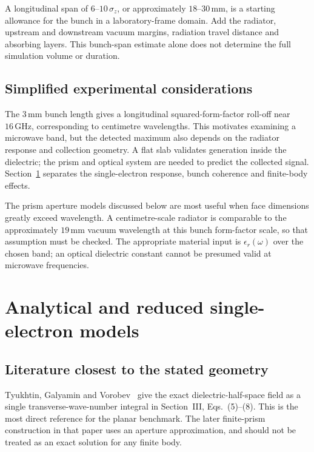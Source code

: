 \documentclass[11pt,a4paper]{article}
\newcommand{\unit}[1]{\,\mathrm{#1}}
\numberwithin{equation}{section}
\begin{document}
A longitudinal span of \(6\)--\(10\,\sigma_z\), or approximately
\(18\)--\(30\unit{mm}\), is a starting allowance for the bunch in a
laboratory-frame domain. Add the radiator, upstream and downstream vacuum
margins, radiation travel distance and absorbing layers. This bunch-span
estimate alone does not determine the full simulation volume or duration.

\subsection{Simplified experimental considerations}

The \(3\unit{mm}\) bunch length gives a longitudinal squared-form-factor
roll-off near \(16\unit{GHz}\), corresponding to centimetre wavelengths.
This motivates examining a microwave band, but the detected maximum also
depends on the radiator response and collection geometry. A flat slab
validates generation inside the dielectric; the prism and optical system
are needed to predict the collected signal. Section~\ref{sec:analytical}
separates the single-electron response, bunch coherence and finite-body effects.

The prism aperture models discussed below are most useful when face dimensions
greatly exceed wavelength. A centimetre-scale radiator is comparable to the
approximately \(19\unit{mm}\) vacuum wavelength at this bunch form-factor
scale, so that assumption must be checked. The appropriate material input is
\(\epsilon_r(\omega)\) over the chosen band; an optical dielectric constant
cannot be presumed valid at microwave frequencies.

\section{Analytical and reduced single-electron models}
\label{sec:analytical}

\subsection{Literature closest to the stated geometry}

Tyukhtin, Galyamin and Vorobev~\cite{tyukhtin2021invertedprism}
give the exact dielectric-half-space field as a single transverse-wave-number
integral in Section~III, Eqs.~(5)--(8). This is the most direct reference
for the planar benchmark. The later finite-prism construction in that paper
uses an aperture approximation, and should not be treated as an exact
solution for any finite body.
\end{document}
